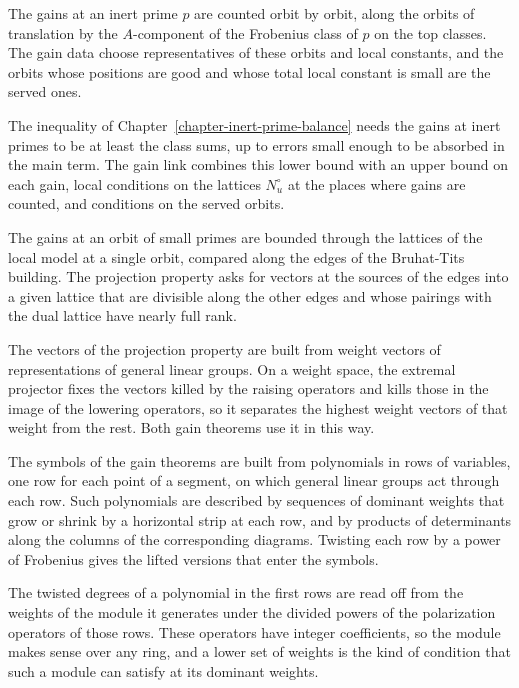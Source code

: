 The gains at an inert prime $p$ are counted orbit by orbit, along the orbits of translation by
the $A$-component of the Frobenius class of $p$ on the top classes. The gain data choose
representatives of these orbits and local constants, and the orbits whose positions are good and
whose total local constant is small are the served ones.

The inequality of Chapter~\ref{chapter-inert-prime-balance} needs the gains at inert primes to be
at least the class sums, up to errors small enough to be absorbed in the main term. The gain link
combines this lower bound with an upper bound on each gain, local conditions on the lattices
$N^\circ_u$ at the places where gains are counted, and conditions on the served orbits.

The gains at an orbit of small primes are bounded through the lattices of the local model at a
single orbit, compared along the edges of the Bruhat-Tits building. The projection property asks for
vectors at the sources of the edges into a given lattice that are divisible along the other edges
and whose pairings with the dual lattice have nearly full rank.

The vectors of the projection property are built from weight vectors of representations of general
linear groups. On a weight space, the extremal projector fixes the vectors killed by the raising
operators and kills those in the image of the lowering operators, so it separates the highest weight
vectors of that weight from the rest. Both gain theorems use it in this way.

The symbols of the gain theorems are built from polynomials in rows of variables, one row for each
point of a segment, on which general linear groups act through each row. Such polynomials are
described by sequences of dominant weights that grow or shrink by a horizontal strip at each row, and
by products of determinants along the columns of the corresponding diagrams. Twisting each row by a
power of Frobenius gives the lifted versions that enter the symbols.

The twisted degrees of a polynomial in the first rows are read off from the weights of the module it
generates under the divided powers of the polarization operators of those rows. These operators have
integer coefficients, so the module makes sense over any ring, and a lower set of weights is the kind
of condition that such a module can satisfy at its dominant weights.

